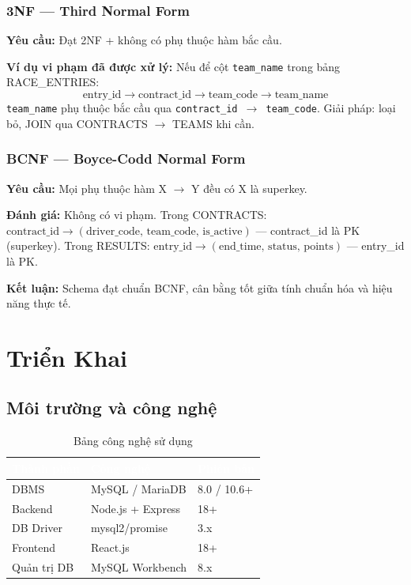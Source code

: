 \documentclass[13pt, a4paper]{report}
\begin{document}
\subsection{3NF --- Third Normal Form}
\textbf{Yêu cầu:} Đạt 2NF + không có phụ thuộc hàm bắc cầu.

\textbf{Ví dụ vi phạm đã được xử lý:} Nếu để cột \texttt{team\_name} trong bảng RACE\_ENTRIES:
\[ \text{entry\_id} \to \text{contract\_id} \to \text{team\_code} \to \text{team\_name} \]
\texttt{team\_name} phụ thuộc bắc cầu qua \texttt{contract\_id $\to$ team\_code}. Giải pháp: loại bỏ, JOIN qua CONTRACTS $\to$ TEAMS khi cần.

\subsection{BCNF --- Boyce-Codd Normal Form}
\textbf{Yêu cầu:} Mọi phụ thuộc hàm X $\to$ Y đều có X là superkey.

\textbf{Đánh giá:} Không có vi phạm. Trong CONTRACTS: $\text{contract\_id} \to (\text{driver\_code, team\_code, is\_active})$ --- contract\_id là PK (superkey). Trong RESULTS: $\text{entry\_id} \to (\text{end\_time, status, points})$ --- entry\_id là PK.

\textbf{Kết luận:} Schema đạt chuẩn BCNF, cân bằng tốt giữa tính chuẩn hóa và hiệu năng thực tế.

\chapter{Triển Khai}

\section{Môi trường và công nghệ}

\begin{table}[h]
\centering
\caption{Bảng công nghệ sử dụng}
\begin{tabularx}{\textwidth}{L{3cm} L{5cm} L{4cm}}
\toprule
{}
\textcolor{white}{\textbf{Thành phần}} & \textcolor{white}{\textbf{Công nghệ}} & \textcolor{white}{\textbf{Phiên bản}} \\
\midrule
DBMS        & MySQL / MariaDB         & 8.0 / 10.6+ \\
Backend     & Node.js + Express       & 18+ \\
DB Driver   & mysql2/promise          & 3.x \\
Frontend    & React.js                & 18+ \\
Quản trị DB & MySQL Workbench         & 8.x \\
\bottomrule
\end{tabularx}
\end{table}
\end{document}
